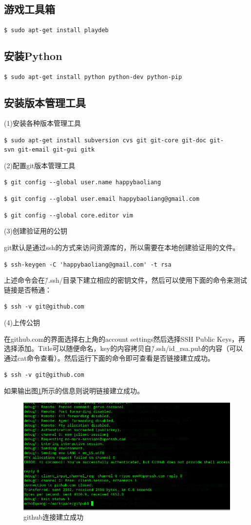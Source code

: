 \subsection{游戏工具箱}
\verb"$ sudo apt-get install playdeb"

\subsection{安装Python}
\verb"$ sudo apt-get install python python-dev python-pip"

\subsection{安装版本管理工具}
(1)安装各种版本管理工具 
		
\verb"$ sudo apt-get install subversion cvs git git-core git-doc git-svn git-email git-gui gitk"

(2)配置git版本管理工具

\verb"$ git config --global user.name happybaoliang"

\verb"$ git config --global user.email happybaoliang@gmail.com"

\verb"$ git config --global core.editor vim"

(3)创建验证用的公钥

git默认是通过ssh的方式来访问资源库的，所以需要在本地创建验证用的文件。

\verb"$ ssh-keygen -C 'happybaoliang@gmail.com' -t rsa"

上述命令会在\~/.ssh/目录下建立相应的密钥文件，然后可以使用下面的命令来测试链接是否畅通：

\verb"$ ssh -v git@github.com"

(4)上传公钥

在github.com的界面选择右上角的account settings然后选择SSH Public Keys，再选择添加。Title可以随便命名，key的内容拷贝自\~/.ssh/id\_rsa.pub的内容（可以通过cat命令查看）。然后运行下面的命令即可查看是否链接建立成功。

\verb"$ ssh -v git@github.com"

如果输出图\ref{github}所示的信息则说明链接建立成功。
\begin{figure}
\centering\includegraphics[scale=0.5]{figures/github.png}
\caption{github连接建立成功}\label{github}
\end{figure}


